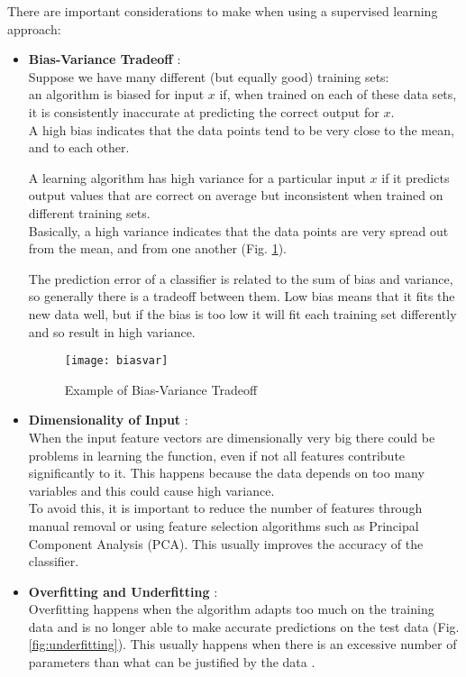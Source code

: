 There are important considerations to make when using a supervised learning approach:
\begin{itemize}
	\item \textbf{Bias-Variance Tradeoff} \cite{biasvar}: \\	
	Suppose we have many different (but equally good) training sets: \\
	an algorithm is biased for input $x$ if, when trained on each of these data sets, it is consistently inaccurate at predicting the correct output for $x$. \\
	A high bias indicates that the data points tend to be very close to the mean, and to each other.
	
	A learning algorithm has high variance for a particular input $x$ if it predicts output values that are correct on average but inconsistent when trained on different training sets. \\
	Basically, a high variance indicates that the data points are very spread out from the mean, and from one another (Fig. \ref{fig:biasvar}).
	
	The prediction error of a classifier is related to the sum of bias and variance, so generally there is a tradeoff between them. Low bias means that it fits the new data well, but if the bias is too low it will fit each training set differently and so result in high variance.
	
	\begin{figure}[H]
		\centering
		\texttt{[image: biasvar]}
		\caption{Example of Bias-Variance Tradeoff \cite{biasvarTradeoff}}
		\label{fig:biasvar}
	\end{figure}	

	\item \textbf{Dimensionality of Input} \cite{wiki:dim_red}:\\ 
	When the input feature vectors are dimensionally very big there could be problems in learning the function, even if not all features contribute significantly to it. This happens because the data depends on too many variables and this could cause high variance. \\
	To avoid this, it is important to reduce the number of features through manual removal or using feature selection algorithms such as Principal Component Analysis (PCA). This usually improves the accuracy of the classifier.
	
	\item \textbf{Overfitting and Underfitting} \cite{overfit}: \\	
	Overfitting happens when the algorithm adapts too much on the training data and is no longer able to make accurate predictions on the test data (Fig. \ref{fig:underfitting}). This usually happens when there is an excessive number of parameters than what can be justified by the data \cite{camb_over}.
	

\end{itemize}
